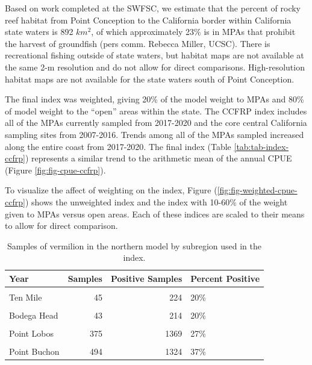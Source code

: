 \documentclass[
  english,
  a4paper,
]{article}
\begin{document}
Based on work completed at the SWFSC, we estimate that the percent of rocky reef habitat from Point Conception to the California border within California state waters is 892 \(km^2\), of which approximately 23\% is in MPAs that prohibit the harvest of groundfish (pers comm. Rebecca Miller, UCSC). There is recreational fishing outside of state waters, but habitat maps are not available at the same 2-m resolution and do not allow for direct comparisons. High-resolution habitat maps are not available for the state waters south of Point Conception.

The final index was weighted, giving 20\% of the model weight to MPAs and 80\% of model
weight to the ``open'' areas within the state. The CCFRP index includes all of the
MPAs currently sampled from 2017-2020 and the core central California sampling sites
from 2007-2016. Trends among all of the MPAs sampled increased along the entire coast
from 2017-2020. The final index (Table \ref{tab:tab-index-ccfrp})
represents a similar trend to the arithmetic mean of the annual CPUE (Figure \ref{fig:fig-cpue-ccfrp}).

To visualize the affect of weighting on the index, Figure (\ref{fig:fig-weighted-cpue-ccfrp})
shows the unweighted index and the index with 10-60\% of the weight given to MPAs versus
open areas. Each of these indices are scaled to their means to allow for direct comparison.

\newpage

\begin{table}

\caption{\label{tab:tab-region-ccfrp}Samples of vermilion in the northern model by subregion used in the index.}
\centering
\begin{tabular}[t]{lrrl}
\toprule
Year & Samples & Positive Samples & Percent Positive\\
\midrule
\cellcolor{gray!6}{South Cape Mendocino} & \cellcolor{gray!6}{84} & \cellcolor{gray!6}{277} & \cellcolor{gray!6}{30\%}\\
Ten Mile & 45 & 224 & 20\%\\
\cellcolor{gray!6}{Stewarts Point} & \cellcolor{gray!6}{111} & \cellcolor{gray!6}{279} & \cellcolor{gray!6}{40\%}\\
Bodega Head & 43 & 214 & 20\%\\
\cellcolor{gray!6}{Ano Nuevo} & \cellcolor{gray!6}{484} & \cellcolor{gray!6}{1879} & \cellcolor{gray!6}{26\%}\\
\addlinespace
Point Lobos & 375 & 1369 & 27\%\\
\cellcolor{gray!6}{Piedras Blancas} & \cellcolor{gray!6}{614} & \cellcolor{gray!6}{966} & \cellcolor{gray!6}{64\%}\\
Point Buchon & 494 & 1324 & 37\%\\
\bottomrule
\end{tabular}
\end{table}
\end{document}
